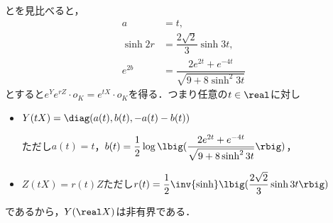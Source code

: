 \begin{npfwn}
  とを見比べると，
  \begin{align*}
    a &= t,\\
    \sinh 2r &= \dfrac{2\sqrt{2}}{3}\sinh 3t, \\
    e^{2b} &= \dfrac{2e^{2t} + e^{-4t}}{\sqrt{9 + 8\sinh^2 3t}}
  \end{align*}
  とすると$e^{Y}e^{rZ}\cdot o_K = e^{tX}\cdot o_K $を得る．つまり任意の$t\in \real$に対し
  \begin{itemize}
  \item $Y(tX) = \diag(a(t) ,b(t) ,-a(t) -b(t) ) $

    ただし$a(t) = t$，$b(t) =\dfrac{1}{2} \log \lbig(\dfrac{2e^{2t} + e^{-4t}}{\sqrt{9 + 8\sinh^2 3t}}\rbig) $，
  \item $Z(tX) = r(t)Z  $ただし$r(t) = \dfrac{1}{2} \inv{\sinh}\lbig( \dfrac{2\sqrt{2}}{3}\sinh 3t\rbig) $
  \end{itemize}
  であるから，$Y(\real X) $は非有界である．  
\end{npfwn}
